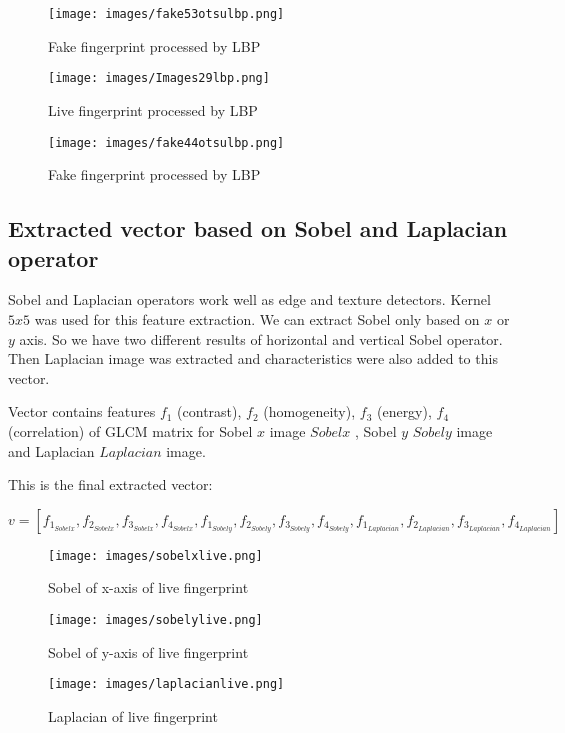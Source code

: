 \documentclass{article}
\begin{document}
\begin{figure}[!htbp]
  \begin{minipage}[b]{0.3\linewidth}
    \centering
    \texttt{[image: images/fake53otsulbp.png]}
    \caption{Fake fingerprint processed by LBP}
  \end{minipage}
  \hspace{0.3cm}
  \begin{minipage}[b]{0.3\linewidth}
    \centering
    \texttt{[image: images/Images29lbp.png]}
    \caption{Live fingerprint processed by LBP}
  \end{minipage}
  \hspace{0.3cm}
    \begin{minipage}[b]{0.3\linewidth}
    \centering
    \texttt{[image: images/fake44otsulbp.png]}
    \caption{Fake fingerprint processed by LBP}
  \end{minipage}
\end{figure}

\subsection{Extracted vector based on Sobel and Laplacian operator}
Sobel and Laplacian operators work well as edge and texture detectors. Kernel $5x5$ was used for this feature extraction. We can extract Sobel only based on $x$ or $y$ axis. So we have two different results of horizontal and vertical Sobel operator. Then Laplacian image was extracted and characteristics were also added to this vector.

Vector contains features $f_1$ (contrast), $f_2$ (homogeneity), $f_3$ (energy), $f_4$ (correlation) of GLCM matrix for Sobel $x$ image $Sobelx$ , Sobel $y$ $Sobely$ image and Laplacian $Laplacian$ image.

This is the final extracted vector:

$$v = [f_1_{Sobelx}, f_2_{Sobelx}, f_3_{Sobelx}, f_4_{Sobelx}, f_1_{Sobely}, f_2_{Sobely}, f_3_{Sobely}, f_4_{Sobely}, f_1_{Laplacian}, f_2_{Laplacian}, f_3_{Laplacian}, f_4_{Laplacian}]$$

\begin{figure}[!htbp]
  \begin{minipage}[b]{0.3\linewidth}
    \centering
    \texttt{[image: images/sobelxlive.png]}
    \caption{Sobel of x-axis of live fingerprint}
  \end{minipage}
  \hspace{0.3cm}
  \begin{minipage}[b]{0.3\linewidth}
    \centering
    \texttt{[image: images/sobelylive.png]}
    \caption{Sobel of y-axis of live fingerprint}
  \end{minipage}
  \hspace{0.3cm}
    \begin{minipage}[b]{0.3\linewidth}
    \centering
    \texttt{[image: images/laplacianlive.png]}
    \caption{Laplacian of live fingerprint}
  \end{minipage}
\end{figure}
\end{document}
